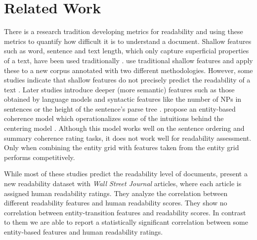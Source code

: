 
\section{Related Work}
\label{sec:related_work}

There is a research tradition developing metrics for readability and using these metrics to quantify how difficult it is to understand a
document. 
Shallow features such as word, sentence and text length, which only capture superficial properties of a text, have been used traditionally \cite{flesch48,kincaid75}.  use traditional shallow features and apply these to a new corpus annotated with two different methodologies. 
However, some studies indicate that shallow features do not precisely predict the readability of a text \cite{fenglijun09,petersen09}. Later studies introduce deeper (more
semantic) features such as those obtained by language models \cite{siluo01,collins-thompson04} and syntactic features like the number of NPs in sentences or the height of the sentence's parse tree \cite{schwarm05,heilman07}. 
  propose an entity-based coherence model which operationalizes some of the intuitions behind the centering model \cite{grosz95}.  
 Although this model works well on the sentence ordering and summary coherence rating tasks, it does not work well for readability assessment. 
 Only when combining the entity grid with features taken from  the entity grid performs competitively.

While most of these studies predict the readability level of documents,  present a new readability dataset with \textit{Wall Street Journal} articles, where each article is assigned human readability ratings. 
They analyze the correlation between different readability features and human readability scores. 
They show no correlation between entity-transition features and readability scores. 
In contrast to them we are able to report a statistically significant correlation between some entity-based features and human readability ratings.

